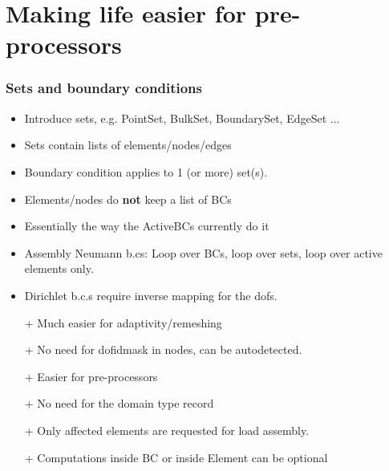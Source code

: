 \documentclass[11pt]{beamer} %
\begin{document}
\section{Making life easier for pre-processors}

\begin{frame}
 \frametitle{Sets and boundary conditions}
\begin{itemize}
 \item Introduce sets, e.g. PointSet, BulkSet, BoundarySet, EdgeSet ...
 \item Sets contain lists of elements/nodes/edges
 \item Boundary condition applies to 1 (or more) set(s).
 \item Elements/nodes do \textbf{not} keep a list of BCs
 \item Essentially the way the ActiveBCs currently do it
 \item Assembly Neumann b.cs: Loop over BCs, loop over sets, loop over active elements only.
 \item Dirichlet b.c.s require inverse mapping for the dofs.
\end{itemize}
\begin{itemize}
 \item[+] Much easier for adaptivity/remeshing
 \item[+] No need for dofidmask in nodes, can be autodetected.
 \item[+] Easier for pre-processors
 \item[+] No need for the domain type record
 \item[+] Only affected elements are requested for load assembly.
 \item[+] Computations inside BC or inside Element can be optional
\end{itemize}
\end{frame}
\end{document}
